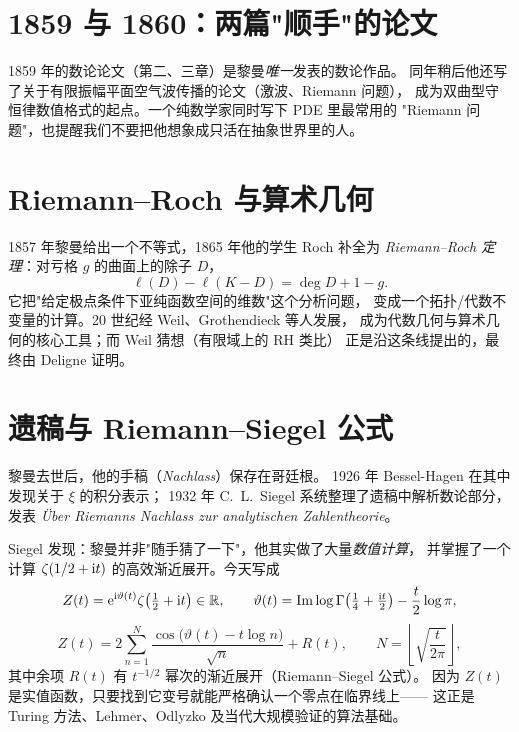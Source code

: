 \section{1859 与 1860：两篇"顺手"的论文}
\label{sec:05-1859-1860}

1859 年的数论论文（第二、三章）是黎曼\emph{唯一}发表的数论作品。
同年稍后他还写了关于有限振幅平面空气波传播的论文（激波、Riemann 问题），
成为双曲型守恒律数值格式的起点。一个纯数学家同时写下 PDE 里最常用的
"Riemann 问题"，也提醒我们不要把他想象成只活在抽象世界里的人。

\section{Riemann--Roch 与算术几何}
\label{sec:05-RR}

1857 年黎曼给出一个不等式，1865 年他的学生 Roch 补全为
\emph{Riemann--Roch 定理}：对亏格 $g$ 的曲面上的除子 $D$，
\begin{equation}\label{eq:05-RR}
  \ell(D)-\ell(K-D)=\deg D+1-g .
\end{equation}
它把"给定极点条件下亚纯函数空间的维数"这个分析问题，
变成一个拓扑/代数不变量的计算。20 世纪经 Weil、Grothendieck 等人发展，
成为代数几何与算术几何的核心工具；而 Weil 猜想（有限域上的 RH 类比）
正是沿这条线提出的，最终由 Deligne 证明\cite{deligne1974}。

\section{遗稿与 Riemann--Siegel 公式}
\label{sec:05-nachlass}

黎曼去世后，他的手稿（\emph{Nachlass}）保存在哥廷根。
1926 年 Bessel-Hagen 在其中发现关于 $\xi$ 的积分表示；
1932 年 C.\ L.\ Siegel 系统整理了遗稿中解析数论部分，发表
\emph{\"Uber Riemanns Nachlass zur analytischen Zahlentheorie}\cite{siegel1932}。

Siegel 发现：黎曼并非"随手猜了一下"，他其实做了大量\emph{数值计算}，
并掌握了一个计算 $\zeta(1/2+\mathrm{i} t)$ 的高效渐近展开。今天写成
\begin{equation}\label{eq:05-Z}
  Z(t)=\mathrm{e}^{\mathrm{i}\vartheta(t)}\zeta\!\left(\tfrac12+\mathrm{i} t\right)\in\mathbb{R},
  \qquad
  \vartheta(t)=\operatorname{Im}\log\Gamma\!\left(\tfrac14+\tfrac{\mathrm{i} t}{2}\right)
  -\frac{t}{2}\log\pi ,
\end{equation}
\begin{equation}\label{eq:05-RS}
  Z(t)=2\sum_{n=1}^{N}\frac{\cos\!\bigl(\vartheta(t)-t\log n\bigr)}{\sqrt{n}}
  +R(t),\qquad N=\left\lfloor\sqrt{\frac{t}{2\pi}}\right\rfloor,
\end{equation}
其中余项 $R(t)$ 有 $t^{-1/2}$ 幂次的渐近展开（Riemann--Siegel 公式）。
因为 $Z(t)$ 是实值函数，只要找到它变号就能严格确认一个零点在临界线上——
这正是 Turing 方法、Lehmer、Odlyzko 及当代大规模验证的算法基础。

